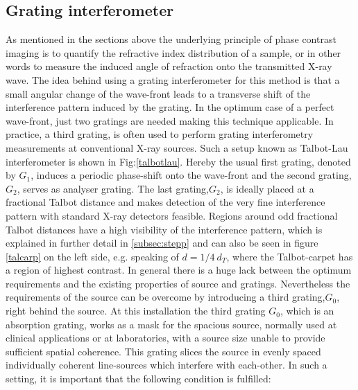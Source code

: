 \subsection{Grating interferometer}\label{subsec:gi}
As mentioned in the sections above the underlying principle of phase contrast imaging is to quantify the refractive index distribution of a sample, or in other words to measure the induced angle of refraction onto the transmitted X-ray wave. The idea behind using a grating interferometer for this method is that a small angular change of the wave-front leads to a transverse shift of the interference pattern induced by the grating. In the optimum case of a perfect wave-front, just two gratings are needed making this technique applicable. In practice, a third grating, is often used to perform grating interferometry measurements at conventional X-ray sources. Such a setup known as Talbot-Lau interferometer is shown in Fig:\ref{talbotlau}. Hereby the usual first grating, denoted by $G_{1}$, induces a periodic phase-shift onto the wave-front and the second grating, $G_{2}$, serves as analyser grating. The last grating,$G_{2}$, is ideally placed at a fractional Talbot distance and makes detection of the very fine interference pattern with standard X-ray detectors feasible.
Regions around odd fractional Talbot distances have a high visibility of the interference pattern, which is explained in further detail in \ref{subsec:stepp} and can also be seen in figure \ref{talcarp} on the left side, e.g. speaking of $d = 1/4\ d_{T}$, where the Talbot-carpet has a region of highest contrast. In general there is a huge lack between the optimum requirements and the existing properties of source and gratings. Nevertheless the requirements of the source can be overcome by introducing a third grating,$G_{0}$, right behind the source. At this installation the third grating $G_{0}$, which is an absorption grating, works as a mask for the spacious source, normally used at clinical applications or at laboratories, with a source size unable to provide sufficient spatial coherence. This grating slices the source in evenly spaced individually coherent line-sources which interfere with each-other. In such a setting, it is important that the following condition is fulfilled:
